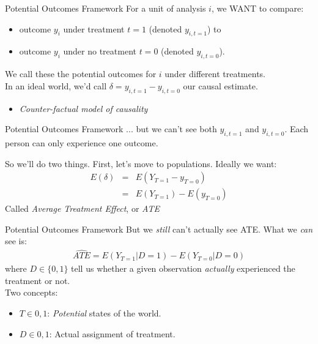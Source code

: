 \documentclass[11pt,handout]{beamer}
\begin{document}
\begin{frame}[c]{Potential Outcomes Framework}
\pause For a unit of analysis $i$, we WANT to compare:
\begin{itemize}
  \item outcome $y_i$ under treatment $t=1$ (denoted $y_{i, t=1}$) to
  \item outcome $y_i$ under no treatment $t=0$ (denoted $y_{i, t=0}$).
\end{itemize}
\pause We call these the \alert{potential outcomes} for $i$ under different treatments.\\
\pause In an ideal world, we'd call \alert{$\delta = y_{i, t=1} - y_{i, t=0}$} our causal estimate.
\begin{itemize}
  \pause \item \emph{Counter-factual model of causality}
\end{itemize}
\end{frame}

\begin{frame}[c]{Potential Outcomes Framework}
... but we can't see both $y_{i, t=1}$ and $y_{i, t=0}$. Each person can only experience one outcome.

So we'll do two things. First, let's move to populations. Ideally we want:
\begin{eqnarray}
  E(\delta) &=& E(Y_{T=1} - y_{T=0}) \nonumber \\
             &=& E(Y_{T=1}) - E(y_{T=0}) \nonumber
\end{eqnarray}
\pause Called \emph{Average Treatment Effect}, or \emph{ATE}
\end{frame}

\begin{frame}[c]{Potential Outcomes Framework}
But we \emph{still} can't actually see ATE. What we \emph{can} see is:
\begin{eqnarray}
\widehat{ATE} = E(Y_{T=1}|D=1) - E(Y_{T=0}|D=0) \nonumber
\end{eqnarray}
where $D\in\{0,1\}$ tell us whether a given observation \emph{actually} experienced the treatment or not.\\
\pause
\vspace{0.1cm}
Two concepts:
\begin{itemize}
  \item $T\in{0,1}$: \emph{Potential} states of the world.
  \item $D\in{0,1}$: Actual assignment of treatment.
\end{itemize}
\end{frame}
\end{document}
